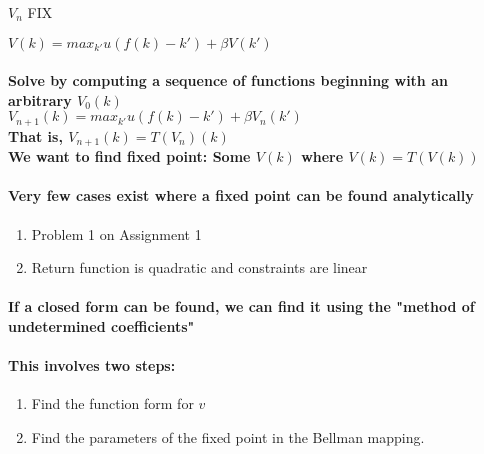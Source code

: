 \documentclass{article}
\begin{document}
${V_n}$ FIX

$ V(k) = max_{k'} u(f(k) - k') + \beta V(k')$

\paragraph{Solve by computing a sequence of functions beginning with
an arbitrary $V_0(k)$\\
$V_{n+1}(k) = max_{k'} u(f(k) - k') + \beta V_n(k')$\\
That is, $V_{n+1}(k) = T(V_n)(k)$\\
We want to find fixed point: Some $V(k)$ where $V(k) = T(V(k))$}

\paragraph{Very few cases exist where a fixed point can be found analytically}
\begin{enumerate}
    \item Problem 1 on Assignment 1
    \item Return function is quadratic and constraints are linear
\end{enumerate}
\paragraph{If a closed form can be found, we can find it using the "method of undetermined coefficients"}
\paragraph{This involves two steps:}
\begin{enumerate}
    \item Find the function form for $v$
    \item Find the parameters of the fixed point in the Bellman mapping.
\end{enumerate}


\end{document}
